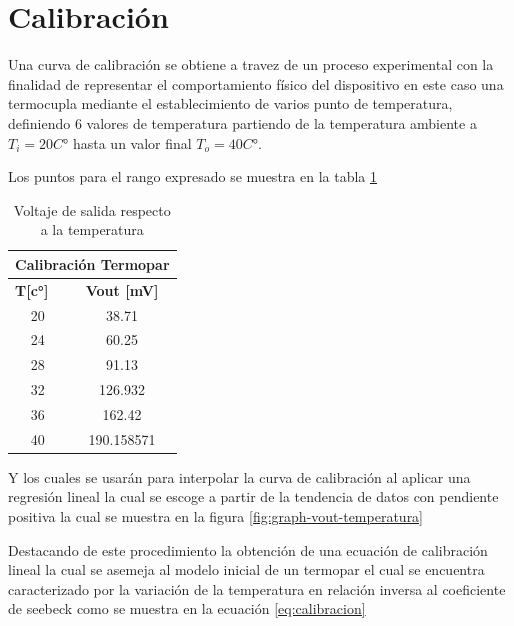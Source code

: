 \section*{Calibración}

Una curva de calibración se obtiene a travez de un proceso experimental con la finalidad de representar el comportamiento físico del dispositivo en este caso una termocupla mediante el establecimiento de varios punto de temperatura, definiendo 6 valores de temperatura partiendo de la temperatura ambiente a $T_i = 20 C°$ hasta un valor final $T_o = 40C°$.

Los puntos para el rango expresado se muestra en la tabla \ref{tab:vout-circuito-termopar}

\begin{table}[]
	\centering
	\begin{tabular}{|cc|}
		\hline
		\multicolumn{2}{|l|}{\textbf{Calibración Termopar}}               \\ \hline
		\multicolumn{1}{|l|}{\textbf{T{[}c°{]}}} & \textbf{Vout {[}mV{]}} \\ \hline
		\multicolumn{1}{|c|}{20}                 & 38.71                  \\ \hline
		\multicolumn{1}{|c|}{24}                 & 60.25                  \\ \hline
		\multicolumn{1}{|c|}{28}                 & 91.13                  \\ \hline
		\multicolumn{1}{|c|}{32}                 & 126.932                \\ \hline
		\multicolumn{1}{|c|}{36}                 & 162.42                 \\ \hline
		\multicolumn{1}{|c|}{40}                 & 190.158571             \\ \hline
	\end{tabular}
	\caption{Voltaje de salida respecto a la temperatura}
	\label{tab:vout-circuito-termopar}
\end{table}

Y los cuales se usarán para interpolar la curva de calibración al aplicar una regresión lineal la cual se escoge a partir de la tendencia de datos con pendiente positiva la cual se muestra en la figura \ref{fig:graph-vout-temperatura}

Destacando de este procedimiento la obtención de una ecuación de calibración lineal la cual se asemeja al modelo inicial de un termopar el cual se encuentra caracterizado por la variación de la temperatura en relación inversa al coeficiente de seebeck como se muestra en la ecuación \ref{eq:calibracion} 

